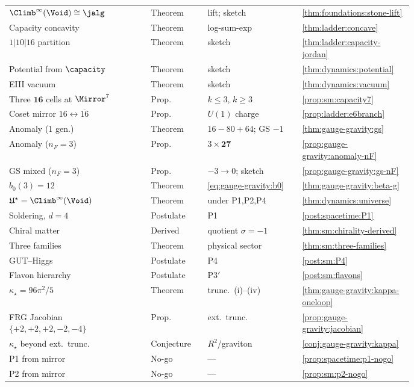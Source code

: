 \begin{table}[ht]
\begin{tabular}{@{}p{0.30\linewidth}p{0.12\linewidth}p{0.20\linewidth}p{0.16\linewidth}@{}}
$\Climb^\infty(\Void)\cong\jalg$ & Theorem & lift; sketch & \ref{thm:foundations:stone-lift} \\
Capacity concavity & Theorem & log-sum-exp & \ref{thm:ladder:concave} \\
$1|10|16$ partition & Theorem & sketch & \ref{thm:ladder:capacity-jordan} \\
Potential from $\capacity$ & Theorem & sketch & \ref{thm:dynamics:potential} \\
EIII vacuum & Theorem & sketch & \ref{thm:dynamics:vacuum} \\
Three $\mathbf{16}$ cells at $\Mirror^7$ & Prop. & $k\leq3$, $k\geq3$ & \ref{prop:sm:capacity7} \\
Coset mirror $16\leftrightarrow\overline{16}$ & Prop. & $U(1)$ charge & \ref{prop:ladder:e6branch} \\
Anomaly (1 gen.) & Theorem & $16-80+64$; GS $-1$ & \ref{thm:gauge-gravity:gs} \\
Anomaly ($n_F=3$) & Prop. & $3\times\mathbf{27}$ & \ref{prop:gauge-gravity:anomaly-nF} \\
GS mixed ($n_F=3$) & Prop. & $-3\to0$; sketch & \ref{prop:gauge-gravity:gs-nF} \\
$b_0(3)=12$ & Theorem & \eqref{eq:gauge-gravity:b0} & \ref{thm:gauge-gravity:beta-g} \\
$\mathfrak{U}^\star=\Climb^\infty(\Void)$ & Theorem & under P1,P2,P4 & \ref{thm:dynamics:universe} \\
\midrule
Soldering, $d=4$ & Postulate & P1 & \ref{post:spacetime:P1} \\
Chiral matter & Derived & quotient $\sigma=-1$ & \ref{thm:sm:chirality-derived} \\
Three families & Theorem & physical sector & \ref{thm:sm:three-families} \\
GUT--Higgs & Postulate & P4 & \ref{post:sm:P4} \\
Flavon hierarchy & Postulate & P3$'$ & \ref{post:sm:flavons} \\
\midrule
$\kappa_\star=96\pi^2/5$ & Theorem & trunc.\ (i)--(iv) & \ref{thm:gauge-gravity:kappa-oneloop} \\
FRG Jacobian $\{+2,+2,+2,-2,-4\}$ & Prop. & ext.\ trunc. & \ref{prop:gauge-gravity:jacobian} \\
$\kappa_\star$ beyond ext.\ trunc. & Conjecture & $R^2$/graviton & \ref{conj:gauge-gravity:kappa} \\
P1 from mirror & No-go & --- & \ref{prop:spacetime:p1-nogo} \\
P2 from mirror & No-go & --- & \ref{prop:sm:p2-nogo} \\

\end{tabular}
\end{table}
